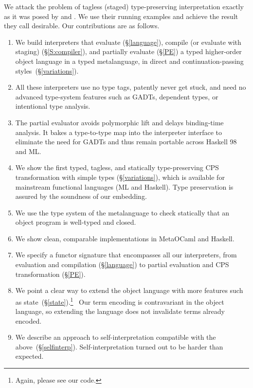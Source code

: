 We attack the problem of tagless (staged) type-preserving
interpretation exactly as it was posed
by \citet{WalidICFP02} and \citet{xi-guarded}.
We use their running examples and achieve the
result they call desirable.  Our contributions are as follows.

\begin{enumerate}
\item We build interpreters that evaluate (\S\ref{language}),
   compile (or evaluate with staging) (\S\ref{S:compiler}), and 
   partially evaluate (\S\ref{PE}) a typed higher-order object language
   in a typed metalanguage, in direct and continuation\hyp passing
   styles\ifshort\else\ (\S\ref{variations})\fi.
\item All these interpreters use no type tags, patently never get stuck,
    and need no advanced type-system features such as GADTs, dependent types,
    or intentional type analysis.
\item The partial evaluator avoids polymorphic lift and delays binding-time
    analysis.  It bakes a type-to-type map into the interpreter
    interface to eliminate the need for GADTs and thus remain portable
    across Haskell 98 and ML.
\ifshort\else
\item We show the first typed, tagless, and statically type-preserving CPS
    transformation with simple types (\S\ref{variations}), which is available for mainstream
    functional languages (ML and Haskell). Type preservation is assured by
    the soundness of our embedding.
\fi
\item We use the type system of the metalanguage
    to check statically that an object program is well-typed and closed.
\item We show clean, comparable implementations in MetaOCaml and Haskell.
\item We specify a functor signature that encompasses all our
  interpreters, from evaluation and compilation (\S\ref{language}) 
   to partial evaluation \ifshort\else and CPS transformation \fi(\S\ref{PE}).
\item We point a clear way to extend the object language with more features
    such as state\ifshort\else~(\S\ref{state})\fi.\ifshort\footnote{Again, please see our code.}\fi
    \ Our term encoding is contravariant in the object language, so
    extending the language does not invalidate terms already encoded.
\item We describe an approach to self\hyp interpretation compatible with the
  above\ifshort\else~(\S\ref{selfinterp})\fi.  Self\hyp interpretation turned
  out to be harder than expected.\ifshort\footnotemark[\value{footnote}]\fi
\end{enumerate}
